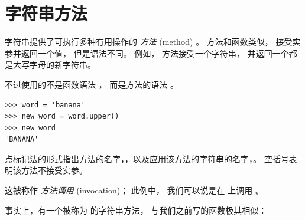 \section{字符串方法}
\label{optional}

  

字符串提供了可执行多种有用操作的 {\em 方法} (method) 。 方法和函数类似， 接受实参并返回一个值， 但是语法不同。 例如， 方法接受一个字符串， 并返回一个都是大写字母的新字符串。


不过使用的不是函数语法  ， 而是方法的语法 。

\begin{lstlisting}
>>> word = 'banana'
>>> new_word = word.upper()
>>> new_word
'BANANA'
\end{lstlisting}

%
  

点标记法的形式指出方法的名字，，以及应用该方法的字符串的名字，。 空括号表明该方法不接受实参。


这被称作 {\em 方法调用} (invocation)； 此例中， 我们可以说是在  上调用  。


事实上，有一个被称为  的字符串方法， 与我们之前写的函数极其相似：

